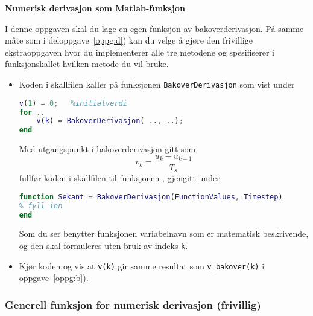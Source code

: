 \item
  {\bf Numerisk derivasjon som Matlab-funksjon}
\label{oppg:e}
  
  I denne oppgaven skal du lage en egen funksjon av
  bakoverderivasjon. På samme måte som i deloppgave~\ref{oppg:d}) kan
  du velge å  gjøre den frivillige ekstraoppgaven hvor du implementerer alle tre
  metodene og spesifiserer i funksjonskallet hvilken metode du vil
  bruke.

  
  \begin{itemize}
  \item  Koden i skallfilen kaller på
    funksjonen {\tt BakoverDerivasjon} som vist under

\begin{lstlisting}[caption={Kodeutdrag som kaller på funksjonen {\tt BakoverDerivasjon}.},
language= Matlab,  label=kode:bakover2, numbers=none] 
v(1) = 0;   %initialverdi
for ..
    v(k) = BakoverDerivasjon( .., ..);
end
\end{lstlisting}

Med utgangspunkt i bakoverderivasjon gitt som
    \begin{equation}
      \label{eq:1ab}
      v_{k} =\frac{u_{k}-u_{k-1}}{T_s}
    \end{equation}
fullfør koden i skallfilen til funksjonen  
, gjengitt under.

\begin{lstlisting}[caption={Funksjonen/filen {\tt BakoverDerivasjon.m}.},
language= Matlab,  label=kode:bakover, numbers=none] 
function Sekant = BakoverDerivasjon(FunctionValues, Timestep)
% fyll inn
end
\end{lstlisting}

    Som du ser benytter funksjonen variabelnavn som er matematisk  
    beskrivende, og den skal formuleres uten bruk av indeks {\tt k}. 
\item Kjør koden  og vis at {\tt v(k)} gir samme resultat som 
    {\tt  v\_bakover(k)} i oppgave~\ref{oppg:b}).
  
\end{itemize}

\newpage
\subsubsection*{Generell funksjon for numerisk derivasjon (frivillig)}

